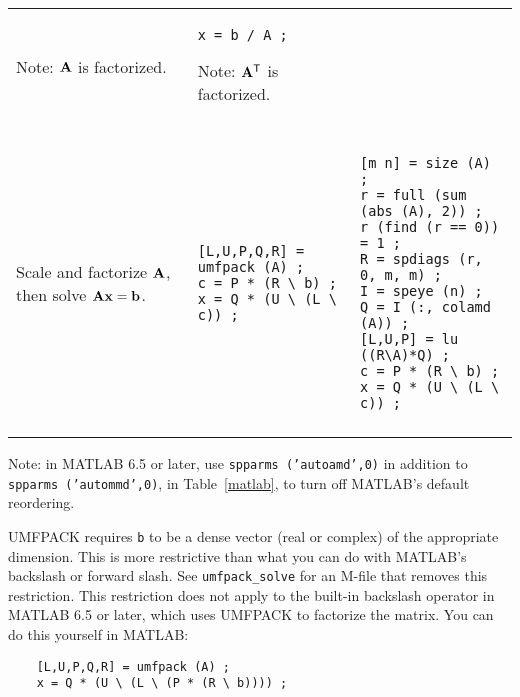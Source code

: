 \documentclass[11pt]{article}
\newcommand{\m}[1]{{\bf{#1}}}       %
\newcommand{\tr}{^{\sf T}}          %
\begin{document}
\begin{table}
{\begin{tabular}{l|l|l}
\begin{minipage}[t]{2.2in}
Note: $\m{A}$ is factorized.
\end{minipage}
&
\begin{minipage}[t]{2.2in}
\begin{verbatim}
x = b / A ;
\end{verbatim}
Note: $\m{A}\tr$ is factorized.
\end{minipage}
 \\
 & & \\
\hline
 & & \\
\begin{minipage}[t]{1.5in}
Scale and factorize $\m{A}$, then solve $\m{Ax}=\m{b}$.
\end{minipage}
&
\begin{minipage}[t]{2.2in}
\begin{verbatim}
[L,U,P,Q,R] = umfpack (A) ;
c = P * (R \ b) ;
x = Q * (U \ (L \ c)) ;
\end{verbatim}
\end{minipage}
&
\begin{minipage}[t]{2.2in}
\begin{verbatim}
[m n] = size (A) ;
r = full (sum (abs (A), 2)) ;
r (find (r == 0)) = 1 ;
R = spdiags (r, 0, m, m) ;
I = speye (n) ;
Q = I (:, colamd (A)) ;
[L,U,P] = lu ((R\A)*Q) ;
c = P * (R \ b) ;
x = Q * (U \ (L \ c)) ;
\end{verbatim}
\end{minipage}
 \\
 & & \\
\hline
\end{tabular}
}
\end{table}

Note: in MATLAB 6.5 or later, use {\tt spparms ('autoamd',0)} in addition to
{\tt spparms ('autommd',0)}, in Table~\ref{matlab}, to turn off MATLAB's
default reordering.

UMFPACK requires
{\tt b} to be a dense vector (real or complex) of the appropriate dimension.
This is more restrictive than what you can do with MATLAB's
backslash or forward slash.  See {\tt umfpack\_solve} for an M-file that
removes this restriction.
This restriction does not apply to the built-in backslash operator
in MATLAB 6.5 or later, which uses UMFPACK to factorize the matrix.
You can do this yourself in MATLAB:

{\footnotesize
\begin{verbatim}
    [L,U,P,Q,R] = umfpack (A) ;
    x = Q * (U \ (L \ (P * (R \ b)))) ;
\end{verbatim}
}
\end{document}
